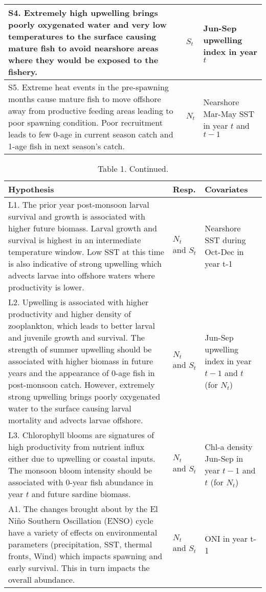 \begin{table}[t]
\begin{tabular}{>{\raggedright\arraybackslash}p{8.5cm}|>{\raggedright\arraybackslash}p{1cm}|>{\raggedright\arraybackslash}p{3cm}}
\hline
S4.  Extremely high upwelling brings poorly oxygenated water and very low temperatures to the surface causing mature fish to avoid nearshore areas where they would be exposed to the fishery. & $S_t$ & Jun-Sep upwelling index in year $t$\\
\hline
S5.  Extreme heat events in the pre-spawning months cause mature fish to move offshore away from productive feeding areas leading to poor spawning condition. Poor recruitment leads to few 0-age in current season catch and 1-age fish in next season's catch. & $N_t$ & Nearshore Mar-May SST in year $t$ and $t-1$\\
\hline
\end{tabular}
\end{table}

\clearpage

\begin{table}[t]

\caption{\label{tab:unnamed-chunk-3}Table 1. Continued.}
\centering
\begin{tabular}{>{\raggedright\arraybackslash}p{8.5cm}|>{\raggedright\arraybackslash}p{1cm}|>{\raggedright\arraybackslash}p{3cm}}
\hline
Hypothesis & Resp. & Covariates\\
\hline
L1.  The prior year post-monsoon larval survival and growth is associated with higher future biomass. Larval growth and survival is highest in an intermediate temperature window. Low SST at this time is also indicative of strong upwelling which advects larvae into offshore waters where productivity is lower. & $N_t$ and $S_t$ & Nearshore SST during Oct-Dec in year t-1\\
\hline
L2. Upwelling is associated with higher productivity and higher density of zooplankton, which leads to better larval and juvenile growth and survival.  The strength of summer upwelling should be associated with higher biomass in future years and the appearance of 0-age fish in post-monsoon catch. However, extremely strong upwelling brings poorly oxygenated water to the surface causing larval mortality and advects larvae offshore. & $N_t$ and $S_t$ & Jun-Sep upwelling index in year $t-1$ and $t$ (for $N_t$)\\
\hline
L3. Chlorophyll blooms are signatures of high productivity from nutrient influx either due to upwelling or coastal inputs.  The monsoon bloom intensity should be associated with 0-year fish abundance in year $t$ and future sardine biomass. & $N_t$ and $S_t$ & Chl-a density Jun-Sep in year $t-1$ and $t$ (for $N_t$)\\
\hline
A1. The changes brought about by the El Niño Southern Oscillation (ENSO) cycle have a variety of effects on environmental parameters (precipitation, SST, thermal fronts, Wind) which impacts spawning and early survival. This in turn impacts the overall abundance. & $N_t$ and $S_t$ & ONI in year t-1\\
\hline
\end{tabular}
\end{table}


